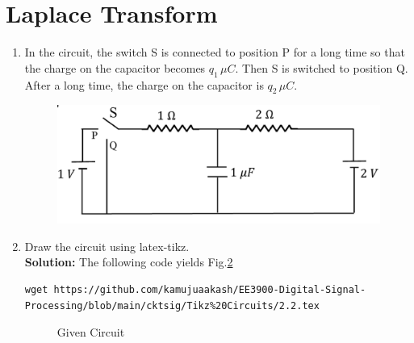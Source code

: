 \documentclass[journal,12pt,twocolumn]{IEEEtran}
\newcommand{\solution}{\noindent \textbf{Solution: }}
\numberwithin{equation}{section}
\renewcommand\thesection{\arabic{section}}
\begin{document}
 \section{Laplace Transform}
\begin{enumerate}[label=\arabic*.,ref=\thesection.\theenumi]
\item In the circuit, the switch S is connected to position P for a long time so that the charge on the capacitor
	becomes $q_1 \, \mu C$. Then S is switched to position Q.  After a long time, the charge on the capacitor is
		$q_2 \, \mu C$.
		\begin{figure}[!ht]
			\centering
			\includegraphics[width=\columnwidth]{figs/ckt.jpg}
			\caption{}
			\label{fig:ckt}
\end{figure}
\item Draw the circuit using latex-tikz.\\
\solution The following code yields Fig.\ref{fig:qn}
\begin{lstlisting}
wget https://github.com/kamujuaakash/EE3900-Digital-Signal-Processing/blob/main/cktsig/Tikz%20Circuits/2.2.tex
\end{lstlisting}
\begin{figure}[!ht]
 \centering
  
\caption{Given Circuit}
\label{fig:qn}
\end{figure}


\end{enumerate}
\end{document}
